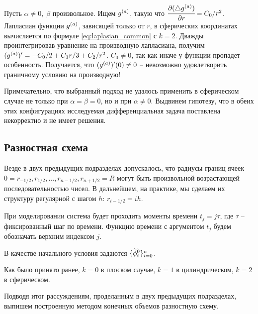 Пусть $\alpha \neq 0, \; \beta$ произвольное. Ищем ${g^{(a)}}$, такую что $\cfrac{\partial (\triangle {g^{(a)}})}{\partial r} = C_0 / r^2$. Лапласиан функции ${g^{(a)}}$, зависящей только от $r$, в сферических координатах вычисляется по формуле \eqref{eq:laplasian_common} с $k = 2$. Дважды проинтегрировав уравнение на производную лапласиана, получим $({g^{(a)}})' = -C_0 / 2 + C_1 r / 3 + C_2 / r^2$. $C_0 \neq 0$, так как иначе у функции пропадет особенность. Получается, что $({g^{(a)}})'(0) \neq 0$ -- невозможно удовлетворить граничному условию на производную!

Примечательно, что выбранный подход не удалось применить в сферическом случае не только при $\alpha = \beta = 0$, но и при $\alpha \neq 0$. Выдвинем гипотезу, что в обеих этих конфигурациях исследуемая дифференциальная задача поставлена некорректно и не имеет решения.


\subsection{Разностная схема}

Везде в двух предыдущих подразделах допускалось, что радиусы границ ячеек $0 = r_{-1/2}, r_{1/2}, ..., r_{n - 1/2}, r_{n + 1/2} = R$ могут быть произвольной возрастающей последовательностью чисел. В дальнейшем, на практике, мы сделаем их структуру регулярной с шагом $h$: $r_{i - 1/2} = ih$.

При моделировании система будет проходить моменты времени $t_j = j \tau$, где $\tau$ -- фиксированный шаг по времени. Функцию времени с аргументом $t_j$ будем обозначать верхним индексом $j$.

В качестве начального условия задаются $\{ {\widetilde{\phi}}_i^0 \}_{i = 0}^n$.

Как было принято ранее, $k = 0$ в плоском случае, $k = 1$ в цилиндрическом, $k = 2$ в сферическом.

Подводя итог рассуждениям, проделанным в двух предыдущих подразделах, выпишем построенную методом конечных объемов разностную схему.

